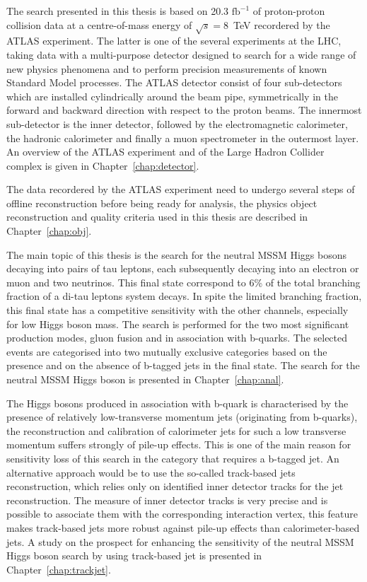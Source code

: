 The search presented in this thesis is based on 20.3 $\text{fb}^{-1}$ of proton-proton collision data at 
a centre-of-mass energy of $\sqrt{s} = 8$~TeV recordered by the ATLAS experiment.
The latter is one of the several experiments
at the LHC, taking data with a  multi-purpose detector designed  to search for  a wide range of new 
physics phenomena and to perform  precision measurements of known Standard Model processes.
The ATLAS detector consist of four sub-detectors which are installed  cylindrically around the
beam pipe, symmetrically in the forward and backward direction with respect to the proton beams.
The innermost sub-detector is the inner detector, followed by the electromagnetic calorimeter, the hadronic calorimeter and finally
a muon spectrometer in the outermost layer.
An overview of the ATLAS experiment and of the Large Hadron Collider complex is given in Chapter~\ref{chap:detector}. 

The data recordered by the ATLAS experiment need to undergo several steps of offline reconstruction 
before being ready for analysis, the physics object reconstruction and quality criteria used in this thesis are described in 
Chapter~\ref{chap:obj}.

The main topic of this thesis is the search for the neutral MSSM Higgs bosons decaying into pairs of tau leptons,
each subsequently decaying into an electron or muon and two neutrinos.
This final state correspond to 6\% of the total branching fraction of a di-tau leptons system decays. 
In spite the  limited branching fraction, this final state has a competitive sensitivity with the other channels, especially
for low Higgs boson mass.
The search is performed for the two most significant production modes, gluon fusion and in association with
b-quarks. The  selected events are categorised into two mutually exclusive categories based on the presence
and on the absence of b-tagged jets in the final state.
The search for the neutral MSSM Higgs boson is presented in Chapter~\ref{chap:anal}.

The Higgs bosons produced in association with b-quark is characterised by the presence of relatively low-transverse momentum
jets (originating from b-quarks), the reconstruction and calibration of calorimeter jets for such a low transverse momentum 
suffers strongly of pile-up effects. This is one of the main reason for sensitivity loss of this search in the category that 
requires a b-tagged jet. An alternative approach would be to use the so-called track-based jets reconstruction, 
which relies only on identified inner detector tracks for the jet reconstruction.  The measure of inner detector tracks
is very precise and is possible to associate them with the corresponding interaction vertex,  
this feature makes track-based jets more robust against pile-up effects than calorimeter-based jets. 
A study on the prospect for enhancing the sensitivity of the neutral MSSM 
Higgs boson search  by using track-based jet is presented in Chapter~\ref{chap:trackjet}.












